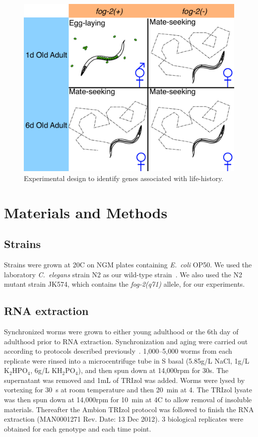 \documentclass[10pt,letterpaper,twocolumn]{article}
\newcommand{\cel}{\emph{C.~elegans}}
\newcommand{\fog}{\emph{\mbox{fog-2}}}
\newcommand{\ecol}{\emph{E.~coli}}
\begin{document}
\begin{figure}[htbp]
\renewcommand{\familydefault}{\sfdefault}\normalfont{}
\centering
\captionsetup{width=\linewidth}
\includegraphics[width=\linewidth]{../output/figs/final_figs/worm_life_fog2_vs_n2.pdf}
\caption{Experimental design to identify genes associated with life-history.
}%
\label{fig:wormlife}
\end{figure}


\section*{Materials and Methods}
\label{sec:materials_methods}

\subsection*{Strains}
\label{sub:Strains}
Strains were grown at 20\degree{}C on NGM plates containing \ecol{} OP50. We used the laboratory \cel{} strain N2 as our wild-type strain~\cite{Brenner1974}. We also used the N2 mutant strain JK574, which contains the \fog{}\emph{(q71)} allele, for our experiments.

\subsection*{RNA extraction}
\label{sb:rna_extraction}
Synchronized worms were grown to either young adulthood or the 6th day of adulthood prior to RNA extraction. Synchronization and aging were carried out according to protocols described previously~\cite{Leighton2014}. 1,000--5,000 worms from each replicate were rinsed into a microcentrifuge tube in S basal (5.85g/L NaCl, 1g/L $\mathrm{K}_2\mathrm{HPO}_4$, 6g/L $\mathrm{KH}_2\mathrm{PO}_4$), and then spun down at 14,000rpm for 30s. The supernatant was removed and 1mL of TRIzol was added. Worms were lysed by vortexing for 30~s at room temperature and then 20~min at 4\degree. The TRIzol lysate was then spun down at 14,000rpm for 10~min at 4\degree{}C to allow removal of insoluble materials. Thereafter the Ambion TRIzol protocol was followed to finish the RNA extraction (MAN0001271 Rev. Date: 13 Dec 2012). 3 biological replicates were obtained for each genotype and each time point.
\end{document}
